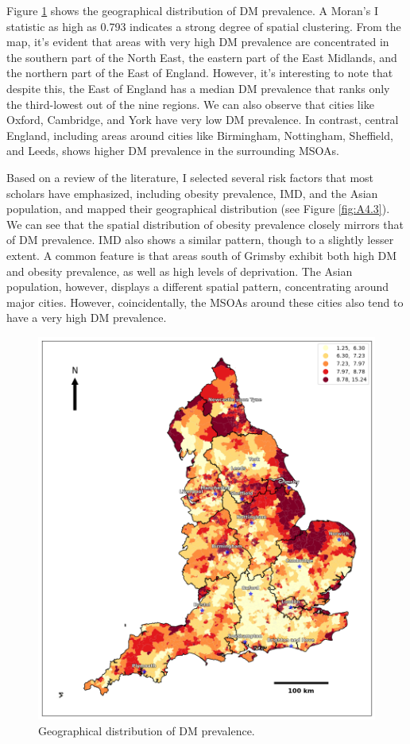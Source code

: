 Figure \ref{fig:A4.2} shows the geographical distribution of DM prevalence. A Moran’s I statistic as high as 0.793 indicates a strong degree of spatial clustering. From the map, it’s evident that areas with very high DM prevalence are concentrated in the southern part of the North East, the eastern part of the East Midlands, and the northern part of the East of England. However, it’s interesting to note that despite this, the East of England has a median DM prevalence that ranks only the third-lowest out of the nine regions. We can also observe that cities like Oxford, Cambridge, and York have very low DM prevalence. In contrast, central England, including areas around cities like Birmingham, Nottingham, Sheffield, and Leeds, shows higher DM prevalence in the surrounding MSOAs.

Based on a review of the literature, I selected several risk factors that most scholars have emphasized, including obesity prevalence, IMD, and the Asian population, and mapped their geographical distribution (see Figure \ref{fig:A4.3}). We can see that the spatial distribution of obesity prevalence closely mirrors that of DM prevalence. IMD also shows a similar pattern, though to a slightly lesser extent. A common feature is that areas south of Grimsby exhibit both high DM and obesity prevalence, as well as high levels of deprivation. The Asian population, however, displays a different spatial pattern, concentrating around major cities. However, coincidentally, the MSOAs around these cities also tend to have a very high DM prevalence.


\begin{figure}[ht]
  \centering
  \includegraphics[width=.99\linewidth]{ucl-latex-thesis-templates-master/Image/datageo_DMprev_4.png}
  \caption{Geographical distribution of DM prevalence.}
  \label{fig:A4.2}
\end{figure}%



